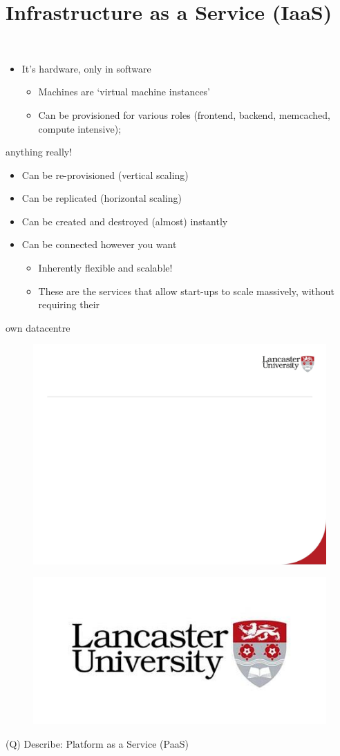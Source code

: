 \documentclass[12pt]{article}
\begin{document}
\section{Infrastructure as a Service (IaaS)}
\\
\begin{itemize}
  \item It’s hardware, only in software
\begin{itemize}
  \item Machines are ‘virtual machine instances’
  \item Can be provisioned for various roles (frontend, backend, memcached, compute intensive); 
\end{itemize}
\end{itemize}
anything really!\\
\begin{itemize}
  \item Can be re-provisioned (vertical scaling)
  \item Can be replicated (horizontal scaling)
  \item Can be created and destroyed (almost) instantly
  \item Can be connected however you want
\begin{itemize}
  \item Inherently flexible and scalable!
  \item These are the services that allow start-ups to scale massively, without requiring their 
\end{itemize}
\end{itemize}
own datacentre\\
\begin{figure}[H]
\includegraphics[width=0.5\linewidth]{page86-image-1.png}
\end{figure}
\begin{figure}[H]
\includegraphics[width=0.5\linewidth]{page86-image-2.png}
\end{figure}
\clearpage
(Q)
Describe: Platform as a Service (PaaS)
\clearpage
\end{document}
